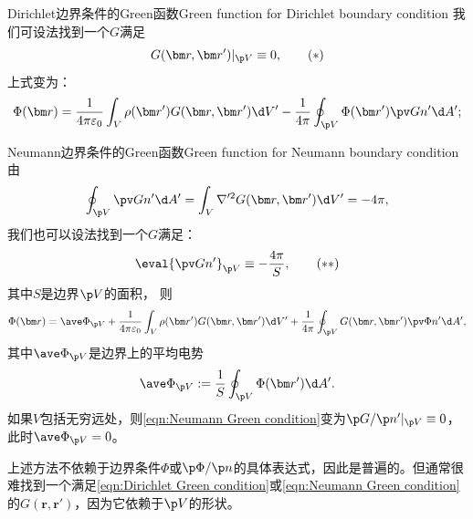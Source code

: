 \begin{theorem}
    {Dirichlet边界条件的Green函数}{Green function for Dirichlet boundary condition}
    我们可设法找到一个$G$满足
    \begin{equation}
        \label{eqn:Dirichlet Green condition}
        G(\bm r,\bm r')|_{\p V}\equiv 0,\tag{$\ast$}
    \end{equation}
    上式变为：
    \begin{equation}
        \label{eqn:Dirichlet Green}
        \Phi(\bm r)=\frac1{4\pi\varepsilon_0}\int_V\rho(\bm r')G(\bm r,\bm r')\d V'-\frac1{4\pi}\oint_{\p V}\Phi(\bm r')\pv G{n'}\d A';
    \end{equation}
\end{theorem}

\begin{theorem}
    {Neumann边界条件的Green函数}{Green function for Neumann boundary condition}
    由
    \[
        \oint_{\p V}\pv G{n'}\d A'=\int_V\nabla'^2G(\bm r,\bm r')\d V'=-4\pi,
    \]
    我们也可以设法找到一个$G$满足：
    \begin{equation}
        \label{eqn:Neumann Green condition}
        \eval{\pv G{n'}}_{\p V}\equiv-\frac{4\pi}S,
        \tag{$\ast\ast$}
    \end{equation}
    其中$S$是边界$\p V$的面积，
    则
    \begin{equation}
        \label{eqn:Neumann Green}
        \Phi(\bm r)=\ave\Phi_{\p V}+\frac1{4\pi\varepsilon_0}\int_V\rho(\bm r')G(\bm r,\bm r')\d V'+\frac1{4\pi}\oint_{\p V}G(\bm r,\bm r')\pv\Phi{n'}\d A',
    \end{equation}
    其中$\ave\Phi_{\p V}$是边界上的平均电势
    \[
        \ave\Phi_{\p V}:=\frac1S\oint_{\p V}\Phi(\bm r')\d A'.
    \]
    如果$V$包括无穷远处，则\eqref{eqn:Neumann Green condition}变为$\p G/\p n'|_{\p V}\equiv 0$，此时$\ave\Phi_{\p V}=0$。
\end{theorem}

\begin{remark}
    上述方法不依赖于边界条件$\Phi$或$\p\Phi/\p n$的具体表达式，因此是普遍的。但通常很难找到一个满足\eqref{eqn:Dirichlet Green condition}或\eqref{eqn:Neumann Green condition}的$G(\bm r, \bm r')$，因为它依赖于$\p V$的形状。
\end{remark}

